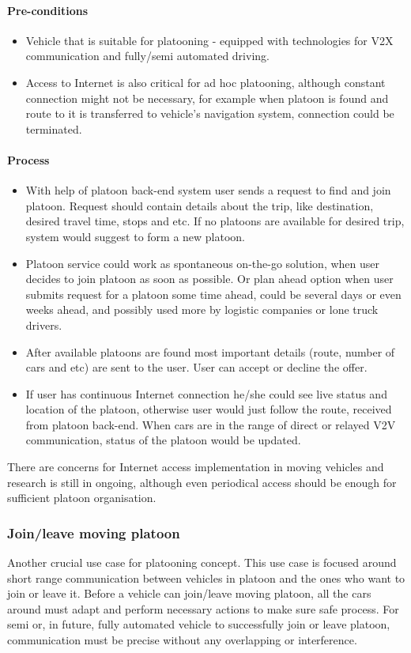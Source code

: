 \paragraph{Pre-conditions}
\begin{itemize}[noitemsep]
    \item Vehicle that is suitable for platooning - equipped with technologies for V2X communication and fully/semi automated driving.
    \item Access to Internet is also critical for ad hoc platooning, although constant connection might not be necessary, for example when platoon is found and route to it is transferred to vehicle's navigation system, connection could be terminated.
\end{itemize}
% 
\paragraph{Process}
\begin{itemize}[noitemsep]
    \item With help of platoon back-end system user sends a request to find and join platoon. Request should contain details about the trip, like destination, desired travel time, stops and etc. If no platoons are available for desired trip, system would suggest to form a new platoon.
    \item Platoon service could work as spontaneous on-the-go solution, when user decides to join platoon as soon as possible. Or plan ahead option when user submits request for a platoon some time ahead, could be several days or even weeks ahead, and possibly used more by logistic companies or lone truck drivers.
    \item After available platoons are found most important details (route, number of cars and etc) are sent to the user. User can accept or decline the offer.
    \item If user has continuous Internet connection he/she could see live status and location of the platoon, otherwise user would just follow the route, received from platoon back-end. When cars are in the range of direct or relayed V2V communication, status of the platoon would be updated.
\end{itemize}
% 
There are concerns for Internet access implementation in moving vehicles and research is still in ongoing, although even periodical access should be enough for sufficient platoon organisation.\par
% 
\subsubsection{Join/leave moving platoon}
% 
Another crucial use case for platooning concept. This use case is focused around short range communication between vehicles in platoon and the ones who want to join or leave it. Before a vehicle can join/leave moving platoon, all the cars around must adapt and perform necessary actions to make sure safe process. For semi or, in future, fully automated vehicle to successfully join or leave platoon, communication must be precise without any overlapping or interference.\par
% 
